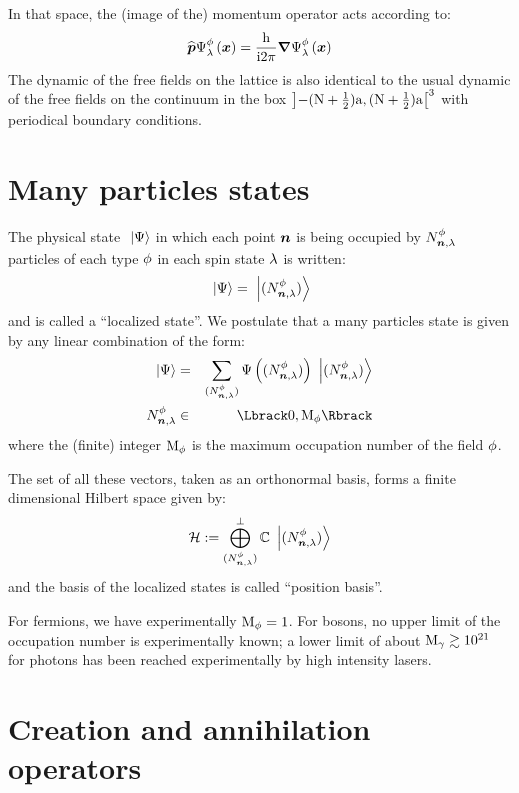 \documentclass[10pt,a4paper,twoside,openany]{book}
\begin{document}
 In that space, the (image of the) momentum operator acts according to:
\begin{equation*}
\Pop \wf \Psi \pt \sp {\sv x} = \frac{\h}{\i 2 \pi} \sv \nabla \wf \Psi \pt \sp {\sv x}
\end{equation*}
The dynamic of the free fields on the lattice is also identical to the usual dynamic of the free fields on the continuum in the box $\left]-(\N+\frac 1 2)\a,(\N+\frac 1 2)\a\right[^3$ with periodical boundary conditions.

\section{Many particles states}
\label{Many particles states}

The physical state $\ket{\Psi}$ in which each point $\n$ is being occupied by $\bX N \pt \n \sp$ particles of each type $\pt$ in each spin state $\sp$ is written:
\begin{equation*}
\ket{\Psi} = \ketFX N \pt \n \sp
\end{equation*}
and is called a ``localized state''. We postulate that a many particles state is given by any linear combination of the form:
\begin{eqnarray*}
\ket{\Psi} & = & \sum_{\bFX N \pt \n \sp} \Psi \left(\bFX N \pt \n \sp \right) \ketFX N \pt \n \sp \\
\bX N \pt \n \sp & \in & \IntRange{0}{\M \pt}
\end{eqnarray*}
where the (finite) integer $\M \pt$ is the maximum occupation number of the field $\pt$.

The set of all these vectors, taken as an orthonormal basis, forms a finite dimensional Hilbert space given by:
\begin{equation*}
\H \eqdef \bigoplus^\perp_{\bFX N \pt \n \sp} \IC \ketFX N \pt \n \sp
\end{equation*}
and the basis of the localized states is called ``position basis''.

 For fermions, we have experimentally $\M \pt = 1$. For bosons, no upper limit of the occupation number is experimentally known; a lower limit of about $\M \photon \gtrsim 10^{21}$ for photons has been reached experimentally by high intensity lasers.

\section{Creation and annihilation operators}
\end{document}
